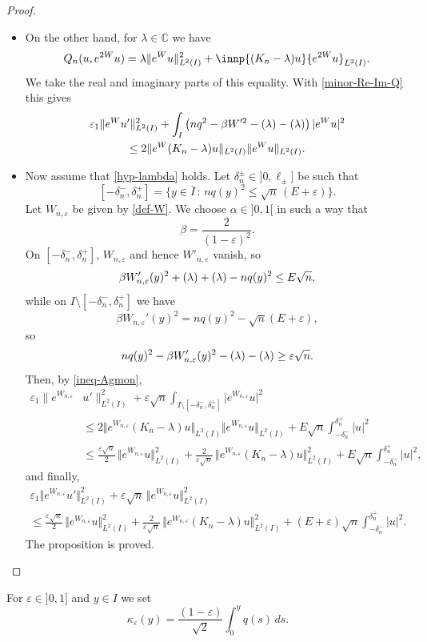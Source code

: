 \documentclass[JEP,XML,SOM,Unicode]{cedram}
\theoremstyle{plain}
\theoremstyle{definition}
\newcommand{\abs}[1]{\vert #1\vert}
\newcommand{\nr}[1]{\Vert #1\Vert}
\newcommand{\bnr}[1]{\bigl\Vert #1\bigr\Vert}
\newcommand{\set}[1]{\{ #1\}}
\newcommand{\1}{\mathds 1}
\newcommand{\st}{\,:\,}
\let\Re\relax
\DeclareMathOperator{\Re}{\mathsf{Re}\mkern2mu}
\let\Im\relax
\DeclareMathOperator{\Im}{\mathsf{Im}\mkern2mu}
\def\C{\mathbb{C}}
\let\b\beta
\let\d\delta
\let\e\varepsilon
\let\l\lambda
\begin{document}
\begin{proof}
\begin{itemize}
\item
On the other hand, for $\l \in \C$ we have
\[
Q_n (u,e^{2W}u) = \l \nr{e^W u}^2_{L^2(I)} + \innp{(K_n-\l)u}{e^{2W}u}_{L^2(I)}.
\]
We take the real and imaginary parts of this equality. With \eqref{minor-Re-Im-Q} this gives
\begin{multline} \label{ineq-Agmon}
\e_1 \nr{e^{W}u'}^2_{L^2(I)} + \int_{I} \left(nq^2 - \beta W'^2 - \Re(\l) - \Im(\l) \right) |e^W u|^2 \\
\leq 2 \nr{e^W (K_n-\l)u}_{L^2(I)} \nr{e^W u}_{L^2(I)}.
\end{multline}

\item
Now assume that \eqref{hyp-lambda} holds. Let $\d_n^\pm \in{}]0, \ell_\pm]$ be such that
\[
[-\d_n^-,\d_n^+] = \set{y \in \bar I \st nq(y)^2 \leq \sqrt{n}\,(E+\e)}.
\]
Let $W_{n,\e}$ be given by \eqref{def-W}. We choose $\alpha \in{}]0,1[$ in such a way that
\[
\beta = \frac {2}{(1-\e)^2}.
\]
On $[-\d_n^-,\d_n^+]$, $W_{n,\e}$ and hence $W'_{n,\e}$ vanish, so
\[
\beta W_{n,\e}'(y)^2 + \Re(\l) + \Im(\l) - nq(y)^2 \leq E \sqrt n,
\]
while on $I \setminus [-\d_n^-,\d_n^+]$ we have
\[
\b W_{n,\e}'(y)^2 = nq(y)^2 - \sqrt{n}(E+\e),
\]
so
\[
n q(y)^2 - \beta W_{n,\e}'(y)^2 - \Re(\l) - \Im(\l) \geq \e \sqrt n.
\]
Then, by \eqref{ineq-Agmon},
\begin{align*}
\e_1 \bigl\|e^{W_{n,\e}} &u'\bigr\|^2_{L^2(I)} + \e \sqrt n \int_{I \setminus [-\d_n^-,\d_n^+]} \abs{e^{W_{n,\e}} u}^2\\
& \leq 2 \bnr{e^{W_{n,\e}} (K_n-\l)u}_{L^2(I)} \bnr{e^{W_{n,\e}} u}_{L^2(I)} + E \sqrt n \int_{-\d_n^-}^{\d_n^+} \abs{u}^2\\
& \leq \frac {\e \sqrt n}2\, \bnr{e^{W_{n,\e}} u}^2_{L^2(I)} + \frac {2}{\e \sqrt n}\, \bnr{e^{W_{n,\e}} (K_n-\l)u}^2_{L^2(I)} + E \sqrt n \int_{-\d_n^-}^{\d_n^+} \abs{u}^2,
\end{align*}
and finally,
\begin{multline*}
\e_1 \bnr{e^{W_{n,\e}} u'}^2_{L^2(I)} + \e \sqrt n\,\bnr{e^{W_{n,\e}} u}^2_{L^2(I)}\\
\leq \frac {\e \sqrt n}{2}\, \bnr{e^{W_{n,\e}} u}^2_{L^2(I)} + \frac {2}{\e \sqrt n}\, \bnr{e^{W_{n,\e}} (K_n-\l)u}^2_{L^2(I)} + (E+\e) \sqrt n \int_{-\d_n^-}^{\d_n^+} \abs{u}^2.
\end{multline*}
The proposition is proved.\qedhere
\end{itemize}
\end{proof}

For $\e \in{}]0,1]$ and $y \in I$ we set
\[
\kappa_\e(y) = \frac {(1-\e)} {\sqrt 2} \int_0^y q(s) \, ds.
\]
\end{document}
